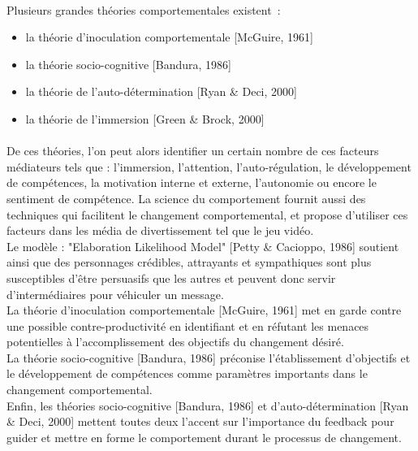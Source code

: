 \paragraph{}Plusieurs grandes théories comportementales existent~:
\begin{itemize}
	\item la théorie d’inoculation comportementale [McGuire, 1961]
	\item la théorie socio-cognitive [Bandura, 1986]
	\item la théorie de l’auto-détermination [Ryan \& Deci, 2000]
	\item la théorie de l’immersion [Green \& Brock, 2000]
\end{itemize}

\paragraph{}De ces théories, l’on peut alors identifier un certain nombre de ces facteurs médiateurs tels que : l’immersion, l’attention, l’auto-régulation, le développement de compétences, la motivation interne et externe, l’autonomie ou encore le sentiment de compétence. La science du comportement fournit aussi des techniques qui facilitent le changement comportemental, et propose d’utiliser ces facteurs dans les média de divertissement tel que le jeu vidéo.\\
Le modèle : "Elaboration Likelihood Model" [Petty \& Cacioppo, 1986] soutient ainsi que des personnages crédibles, attrayants et sympathiques sont plus susceptibles d’être persuasifs que les autres et peuvent donc servir d’intermédiaires pour véhiculer un message. \\
La théorie d’inoculation comportementale [McGuire, 1961] met en garde contre une possible contre-productivité en identifiant et en réfutant les menaces potentielles à l’accomplissement des objectifs du changement désiré.\\
La théorie socio-cognitive [Bandura, 1986] préconise l’établissement d’objectifs et le développement de compétences comme paramètres importants dans le changement comportemental.\\
Enfin, les théories socio-cognitive [Bandura, 1986] et d’auto-détermination [Ryan \& Deci, 2000] mettent toutes deux l’accent sur l’importance du feedback pour guider et mettre en forme le comportement durant le processus de changement.	


